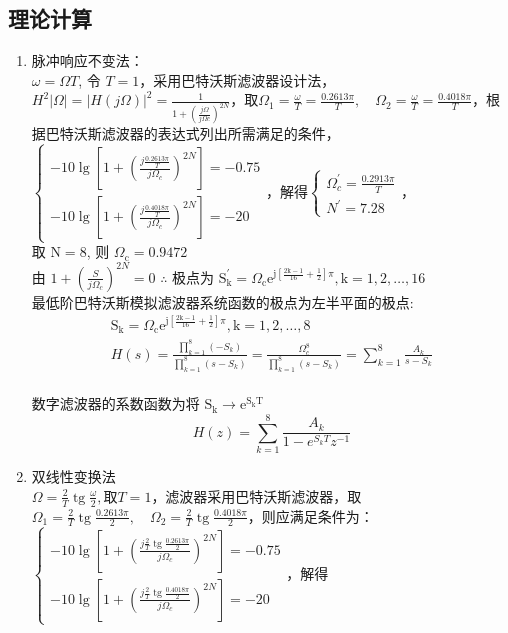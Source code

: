 \documentclass{seuer}
\begin{document}
\subsection{理论计算}
\begin{enumerate}
	\item 脉冲响应不变法：\\$\omega=\Omega T$, 令 $T=1$，采用巴特沃斯滤波器设计法，$H^2|\Omega|=|H(j \Omega)|^2=\frac{1}{1+\left(\frac{j \Omega}{j \Omega c}\right)^{2 N}}$，取$\Omega_1=\frac{\omega}{T}=\frac{0.2613 \pi}{T}, \quad \Omega_2=\frac{\omega}{T}=\frac{0.4018 \pi}{T}$，根据巴特沃斯滤波器的表达式列出所需满足的条件，\\$\left\{\begin{array}{l}-10 \lg \left[1+\left(\frac{j \frac{0.2613 \pi}{T}}{j \Omega_c}\right)^{2 N}\right]=-0.75 \\ -10 \lg \left[1+\left(\frac{j \frac{0.4018 \pi}{T}}{j \Omega_c}\right)^{2 N}\right]=-20\end{array}\right.$，解得$\left\{\begin{array}{l}\Omega^{\prime}_c=\frac{0.2913 \pi}{T} \\ N^{\prime}=7.28\end{array}\right.$，\\取 $\mathrm{N}=8$, 则 $\Omega_\mathrm{c}=0.9472$
	\\由 $1+\left(\frac{S}{j \Omega_c}\right)^{2 N}=0$
	$\therefore$ 极点为 $\mathrm{S}_{\mathrm{k}}^{\prime}=\Omega_{\mathrm{c}} \mathrm{e}^{\mathrm{j}\left[\frac{2 \mathrm{k}-1}{16}+\frac{1}{2}\right] \pi}, \mathrm{k}=1,2, \ldots,16$
	\\最低阶巴特沃斯模拟滤波器系统函数的极点为左半平面的极点:
	$$
	\begin{gathered}
		\mathrm{S}_{\mathrm{k}}=\Omega_{\mathrm{c}} \mathrm{e}^{\mathrm{j}\left[\frac{2 \mathrm{k}-1}{16}+\frac{1}{2}\right] \pi}, \mathrm{k}=1,2, \ldots, 8 \\
		H(s)=\frac{\prod_{k=1}^8(-S_k)}{\prod_{k=1}^8(s-S_k)}=\frac{\Omega _c^8}{\prod_{k=1}^8(s-S_k)}=\sum_{k=1}^8 \frac{A_k}{s-S_k}
	\end{gathered}
	$$
	\\数字滤波器的系数函数为将 $\mathrm{S_k} \rightarrow \mathrm{e}^{\mathrm{S_kT}}$
	$$
	H(z)=\sum_{k=1}^8 \frac{A_k}{1-e^{S_k T} z^{-1}}
	$$
	\item 双线性变换法
	\\$\Omega=\frac{2}{T} \operatorname{tg} \frac{\omega}{2},
	取T=1$，滤波器采用巴特沃斯滤波器，取$\Omega_1=\frac{2}{T} \operatorname{tg} \frac{0.2613 \pi}{2}, \quad \Omega_2=\frac{2}{T} \operatorname{tg} \frac{0.4018 \pi}{2}$，则应满足条件为：$\left\{\begin{array}{l}-10 \lg \left[1+\left(\frac{j \frac{2}{T} \operatorname{tg} \frac{0.2613 \pi}{2}}{j \Omega_c}\right)^{2 N}\right]=-0.75 \\ -10 \lg \left[1+\left(\frac{j \frac{2}{T} \operatorname{tg} \frac{0.4018 \pi}{2}}{j \Omega_c}\right)^{2 N}\right]=-20\end{array}\right.$，解得

\end{enumerate}
\end{document}
